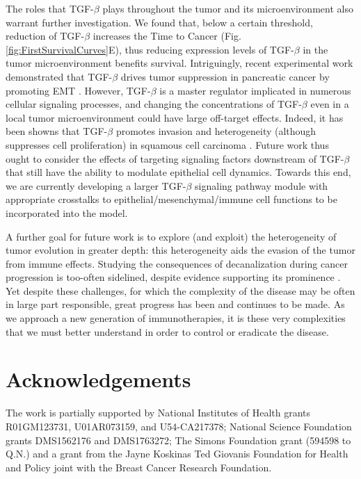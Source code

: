 \documentclass[11pt]{article}
\begin{document}
\par
The roles that TGF-$\beta$ plays throughout the tumor and its microenvironment also warrant further investigation. We found that, below a certain threshold, reduction of TGF-$\beta$ increases the Time to Cancer  (Fig. \ref{fig:FirstSurvivalCurves}E), thus reducing expression levels of TGF-$\beta$ in the tumor microenvironment benefits survival. Intriguingly, recent experimental work demonstrated that TGF-$\beta$ drives tumor suppression in pancreatic cancer by promoting EMT \cite{david16_tgfv}. However, TGF-$\beta$ is a master regulator implicated in numerous cellular signaling processes, and changing the concentrations of TGF-$\beta$ even in a local tumor microenvironment could have large off-target effects. Indeed, it has been showns that TGF-$\beta$ promotes invasion and heterogeneity (although suppresses cell proliferation) in squamous cell carcinoma \cite{oshimori15_tgfv}. Future work thus ought to consider the effects of targeting signaling factors downstream of TGF-$\beta$ that still have the ability to modulate epithelial cell dynamics. Towards this end, we are currently developing a larger TGF-$\beta$ signaling pathway module with appropriate crosstalks to  epithelial/mesenchymal/immune cell functions to be incorporated into the model.
\par
A further goal for future work is to explore (and exploit) the heterogeneity of tumor evolution in greater depth: this heterogeneity aids the evasion of the tumor from immune effects. Studying the consequences of decanalization \cite{gibson09_decanalization} during cancer progression is too-often sidelined, despite evidence supporting its prominence \cite{cyll17_tumour, punt17_tumour, dagogo-jack18_tumour}. Yet despite these challenges, for which the complexity of the disease may be often in large part responsible, great progress has been and continues to be made. As we approach a new generation of immunotherapies, it is these very complexities that we must better understand in order to control or eradicate the disease.



\section*{Acknowledgements}
The work is partially supported by National Institutes of Health grants R01GM123731, U01AR073159, and U54-CA217378; National Science Foundation grants DMS1562176 and DMS1763272; The Simons Foundation grant (594598 to Q.N.) and a grant from the Jayne Koskinas Ted Giovanis Foundation for Health and Policy joint with the Breast Cancer Research Foundation.




\end{document}
